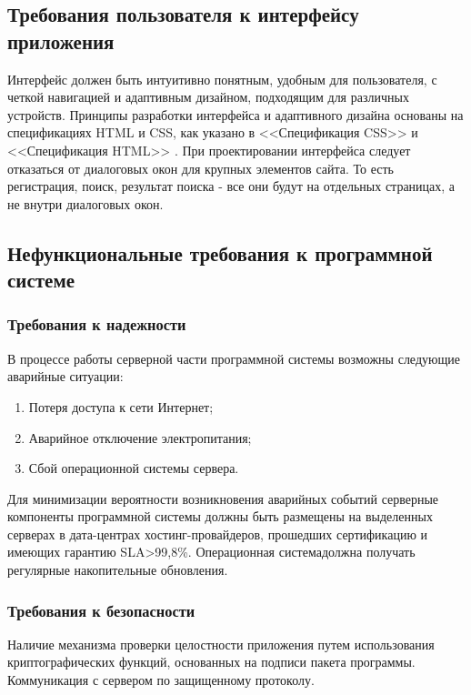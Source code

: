 \subsection{Требования пользователя к интерфейсу приложения}
Интерфейс должен быть интуитивно понятным, удобным для пользователя, с четкой навигацией и адаптивным дизайном, подходящим для различных устройств. Принципы разработки интерфейса и адаптивного дизайна основаны на спецификациях HTML и CSS, как указано в <<Спецификация CSS>> \cite{cssspecs} и <<Спецификация HTML>> \cite{htmlbook}.
При проектировании интерфейса следует отказаться от диалоговых окон для крупных элементов сайта. То есть регистрация, поиск, результат поиска - все они будут на отдельных страницах, а не внутри диалоговых окон.

\subsection{Нефункциональные требования к программной системе}

\subsubsection{Требования к надежности}
В процессе работы серверной части программной системы возможны следующие аварийные ситуации:
\begin{enumerate}
\item Потеря доступа к сети Интернет;
\item Аварийное отключение электропитания;
\item Сбой операционной системы сервера.
\end{enumerate}

Для минимизации вероятности возникновения аварийных событий серверные компоненты программной системы должны быть размещены на выделенных серверах в дата-центрах хостинг-провайдеров, прошедших сертификацию и имеющих гарантию SLA>99,8\%. Операционная системадолжна получать регулярные накопительные обновления.

\subsubsection{Требования к безопасности}
Наличие механизма проверки целостности приложения путем использования криптографических функций, основанных на подписи пакета программы. Коммуникация с сервером по защищенному протоколу.

